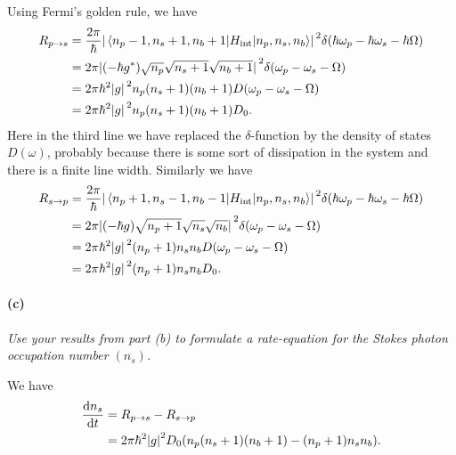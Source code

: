 \documentclass[hyperref, a4paper]{article}
\begin{document}
Using Fermi's golden rule, we have
\begin{equation}
    \begin{aligned}
        R_{p \to s} &= \frac{2\pi}{\hbar} \abs*{\mel*{n_p - 1, n_s + 1, n_b + 1}{H_{\text{int}}}{n_p, n_s, n_b}}^2 \delta(\hbar \omega_p  - \hbar \omega_s - \hbar \Omega) \\
        &= 2\pi \abs*{
            (- \hbar g^*) \sqrt{n_p} \sqrt{n_s + 1} \sqrt{n_b + 1}
        }^2 \delta(\omega_p - \omega_s - \Omega) \\
        &= 2 \pi \hbar^2 \abs*{g}^2 n_p (n_s + 1) (n_b + 1) D(\omega_p - \omega_s - \Omega) \\
        &=  2 \pi \hbar^2 \abs*{g}^2 n_p (n_s + 1) (n_b + 1) D_0.
    \end{aligned}
\end{equation}
Here in the third line we have replaced the $\delta$-function by the density of states $D(\omega)$, 
probably because there is some sort of dissipation in the system and there is a finite line width. 
Similarly we have 
\begin{equation}
    \begin{aligned}
        R_{s \to p} &= \frac{2\pi}{\hbar} \abs*{\mel*{n_p + 1, n_s - 1, n_b - 1}{H_{\text{int}}}{n_p, n_s, n_b}}^2 
        \delta(\hbar \omega_p - \hbar \omega_s - \hbar \Omega) \\
        &= 2 \pi \abs*{(- \hbar g) \sqrt{n_p + 1} \sqrt{n_s} \sqrt{n_b}}^2 \delta(\omega_p - \omega_s - \Omega) \\
        &= 2 \pi \hbar^2 \abs*{g}^2 (n_p + 1) n_s n_b D(\omega_p - \omega_s - \Omega) \\
        &= 2 \pi \hbar^2 \abs*{g}^2 (n_p + 1) n_s n_b D_0.
    \end{aligned}
\end{equation}

\paragraph*{(c)} \textit{
    Use your results from part (b) to formulate a rate-equation for the Stokes photon occupation number $\left(n_s\right)$.
} 

We have 
\begin{equation}
    \begin{aligned}
        \dv{n_s}{t} &= R_{p \to s} - R_{s \to p} \\
        &= 2\pi \hbar^2 \abs{g}^2 D_0 (
            n_p (n_s + 1) (n_b + 1) - (n_p + 1) n_s n_b 
        ).
    \end{aligned}
\end{equation}
\end{document}
